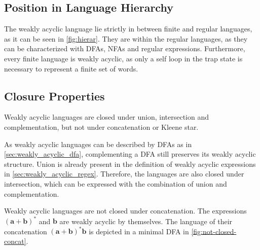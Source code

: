 \subsection{Position in Language Hierarchy}
The weakly acyclic language lie strictly in between finite and regular languages, as it can be seen in \autoref{fig:hierar}.
They are within the regular languages, as they can be characterized with DFAs, NFAs and regular expressions. Furthermore, every finite language is weakly acyclic, as only a self loop in the trap state is necessary to represent a finite set of words.


\subsection{Closure Properties}
Weakly acyclic languages are closed under union, intersection and complementation, but not under concatenation or Kleene star. 
\par 
As weakly acyclic languages can be described by DFAs as in \autoref{sec:weakly_acyclic_dfa}, complementing a DFA still preserves its weakly acyclic structure. Union is already present in the definition of weakly acyclic expressions in \autoref{sec:weakly_acyclic_regex}. Therefore, the languages are also closed under intersection, which can be expressed with the combination of union and complementation. 
\par
Weakly acyclic languages are not closed under concatenation. The expressions $\bm{(a + b)^{*}}$ and $\bm{b}$ are weakly acyclic by themselves. The language of their concatenation $\bm{(a + b)^{*}b}$ is depicted in a minimal DFA in \autoref{fig:not-closed-concat}.

